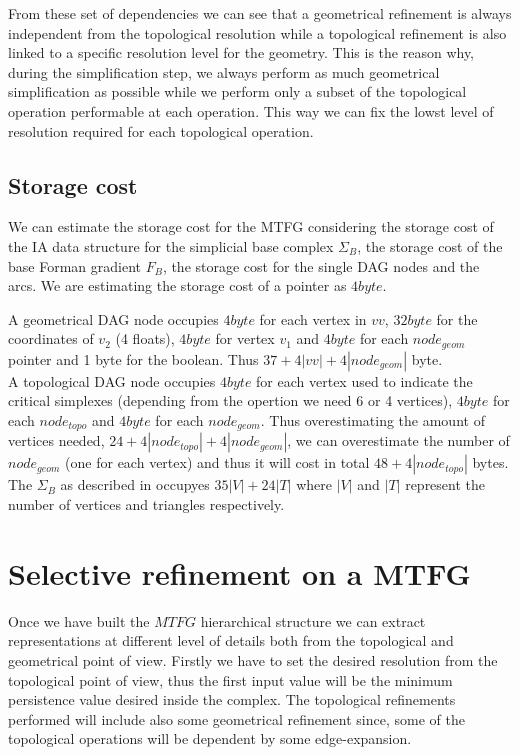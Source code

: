 \documentclass[preprint,5p,times,onecolumn]{article}
\begin{document}
From these set of dependencies we can see that a geometrical refinement is always independent from the topological resolution while a topological refinement is also linked to a specific resolution level for the geometry. This is the reason why, during the simplification step, we always perform as much geometrical simplification as possible while we perform only a subset of the topological operation performable at each operation. This way we can fix the lowst level of resolution required for each topological operation.   

\subsection{Storage cost}

We can estimate the storage cost for the MTFG considering the storage cost of the IA data structure for the simplicial base complex $\Sigma_B$, the storage cost of the base Forman gradient $F_B$, the storage cost for the single DAG nodes and the arcs. We are estimating the storage cost of a pointer as $4byte$.


A geometrical DAG node occupies $4 byte$ for each vertex in $vv$, $32 byte$ for the coordinates of $v_2$ (4 floats), $4 byte$ for vertex $v_1$ and $4 byte$ for each $node_{geom}$ pointer and 1 byte for the boolean. Thus $37 + 4|vv| + 4|node_{geom}|$ byte. \\

A topological DAG node occupies $4 byte$ for each vertex used to indicate the critical simplexes (depending from the opertion we need 6 or 4 vertices), $4 byte$ for each $node_{topo}$ and $4 byte$ for each $node_{geom}$. Thus overestimating the amount of vertices needed, $24 + 4|node_{topo}| + 4|node_{geom}|$, we can overestimate the number of $node_{geom}$ (one for each vertex) and thus it will cost in total
$48 + 4|node_{topo}|$ bytes.\\

The $\Sigma_B$ as described in \cite{Niel97} occupyes $35|V|+24|T|$ where $|V|$ and $|T|$ represent the number of vertices and triangles respectively.




\section{Selective refinement on a MTFG}
\label{sec:query}

Once we have built the $MTFG$ hierarchical structure we can extract representations at different level of details both from the topological and geometrical point of view.
Firstly we have to set the desired resolution from the topological point of view, thus the first input value will be the minimum persistence value desired inside the complex. The topological refinements performed will include also some geometrical refinement since, some of the topological operations will be dependent by some edge-expansion.
\end{document}
